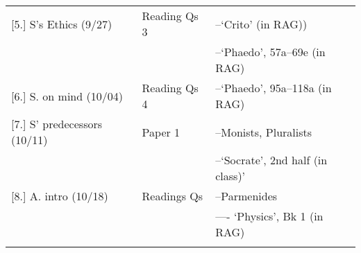 \documentclass[article,oneside]{memoir}
\begin{document}
\begin{center}
\begin{longtable}{p{4.5cm}p{2cm}p{4.5cm}}
[5.] S's Ethics (9/27)			& Reading Qs 3			& --`Crito' (in RAG)) \\
			     			& 				         & --`Phaedo', 57a--69e (in RAG)  \\ [1.8\baselineskip]  \hline
                                   

[6.] S. on mind  (10/04)		& Reading Qs	4	    	 &  --`Phaedo', 95a--118a  (in RAG)\\ [1.8\baselineskip]  \hline %

  
							
[7.] S' predecessors (10/11)	  	& Paper 1			& --Monists, Pluralists   \\ %
							& 				 & --`Socrate', 2nd half (in class)' \\ [1.8\baselineskip] \hline				
							
										
[8.] A. intro		 (10/18)	  	& Readings Qs			& --Parmenides   \\ %
							& 				 & ---- `Physics', Bk 1 (in RAG) \\ \\ [1.8\baselineskip] \hline					

				     			 



                                  			      

\end{longtable}
\end{center}
\end{document}
